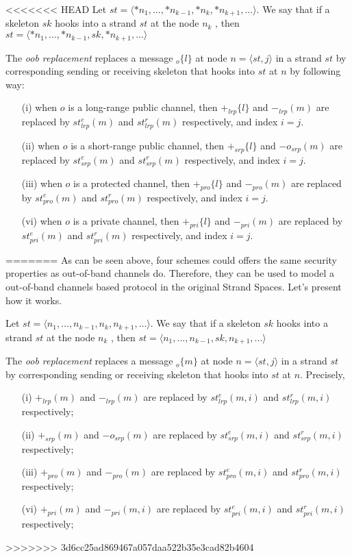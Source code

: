 <<<<<<< HEAD
Let $st = \langle *n_1,...,*n_{k-1},*n_k,*n_{k+1},... \rangle$. We say that if a skeleton $sk$ hooks into a strand $st$ at the node $n_k$ , then $st = \langle *n_1,...,*n_{k-1},sk,*n_{k+1},... \rangle$

\begin{Definition}\label{eos}
The \emph{oob replacement} replaces a message $_o\{l\}$ at node $n=\langle st,j \rangle$ in a strand $st$ by corresponding sending or receiving skeleton that hooks into $st$ at $n$ by following way:

\begin{enumerate}
\item [(i)] when $o$ is a long-range public channel, then $+_{lrp}\{l\}$ and $-_{lrp}(m)$ are replaced by $st^e_{lrp}(m)$ and $st^r_{lrp}(m)$ respectively, and index $i = j$. 
\item [(ii)] when $o$ is a short-range public channel, then $+_{srp}\{l\}$ and $-o_{srp}(m)$ are replaced by $st^e_{srp}(m)$ and $st^r_{srp}(m)$ respectively, and index $i = j$. 
\item [(iii)] when $o$ is a protected channel, then $+_{pro}\{l\}$ and $-_{pro}(m)$ are replaced by $st^e_{pro}(m)$ and $st^r_{pro}(m)$ respectively, and index $i = j$. 
\item [(vi)] when $o$ is a private channel, then $+_{pri}\{l\}$ and $-_{pri}(m)$ are replaced by $st^e_{pri}(m)$ and $st^r_{pri}(m)$ respectively, and index $i = j$. 
\end{enumerate}
=======
As can be seen above, four schemes could offers the same security properties as out-of-band channels do. Therefore, they can be used to model a out-of-band channels based protocol in the original Strand Spaces. Let's present how it works. 

Let $st = \langle n_1,...,n_{k-1},n_k,n_{k+1},... \rangle$. We say that if a skeleton $sk$ hooks into a strand $st$ at the node $n_k$ , then $st = \langle n_1,...,n_{k-1},sk,n_{k+1},... \rangle$

\begin{Definition}\label{eos}
The \emph{oob replacement} replaces a message $_o\{m\}$ at node $n=\langle st,j \rangle$ in a strand $st$ by corresponding sending or receiving skeleton that hooks into $st$ at $n$. Precisely, 

\begin{enumerate}
\item [(i)] $+_{lrp}(m)$ and $-_{lrp}(m)$ are replaced by $st^e_{lrp}(m,i)$ and $st^r_{lrp}(m,i)$ respectively;
\item [(ii)] $+_{srp}(m)$ and $-o_{srp}(m)$ are replaced by $st^e_{srp}(m,i)$ and $st^r_{srp}(m,i)$ respectively;
\item [(iii)] $+_{pro}(m)$ and $-_{pro}(m)$ are replaced by $st^e_{pro}(m,i)$ and $st^r_{pro}(m,i)$ respectively;
\item [(vi)] $+_{pri}(m)$ and $-_{pri}(m,i)$ are replaced by $st^e_{pri}(m,i)$ and $st^r_{pri}(m,i)$ respectively;\end{enumerate}
>>>>>>> 3d6cc25ad869467a057daa522b35e3cad82b4604
\end{Definition}


\end{Definition}
